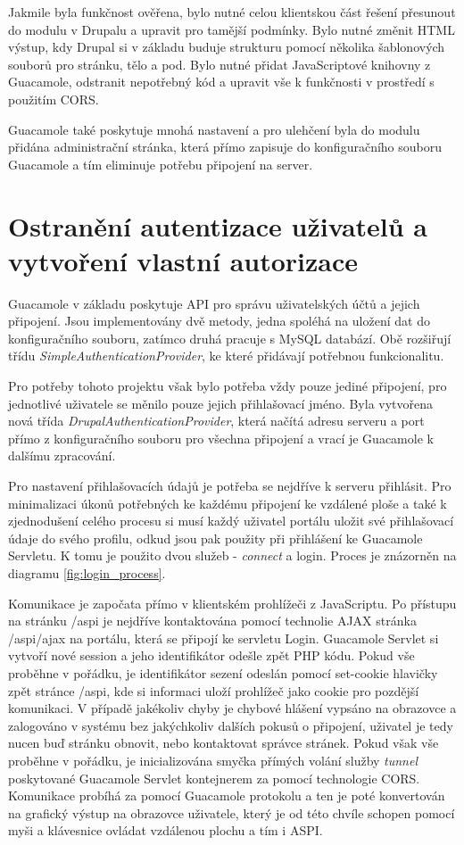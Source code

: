 Jakmile byla funkčnost ověřena, bylo nutné celou klientskou část řešení přesunout do modulu v Drupalu a upravit pro tamější podmínky. Bylo nutné změnit HTML výstup, kdy Drupal si v základu buduje strukturu pomocí několika šablonových souborů pro stránku, tělo a pod. Bylo nutné přidat JavaScriptové knihovny z Guacamole, odstranit nepotřebný kód a upravit vše k funkčnosti v prostředí s použitím CORS. 

Guacamole také poskytuje mnohá nastavení a pro ulehčení byla do modulu přidána administrační stránka, která přímo zapisuje do konfiguračního souboru Guacamole a tím eliminuje potřebu připojení na server. 

\section{Ostranění autentizace uživatelů a vytvoření vlastní autorizace}
Guacamole v základu poskytuje API pro správu uživatelských účtů a jejich připojení. Jsou implementovány dvě metody, jedna spoléhá na uložení dat do konfiguračního souboru, zatímco druhá pracuje s MySQL databází. Obě rozšiřují třídu \emph{SimpleAuthenticationProvider}, ke které přidávají potřebnou funkcionalitu. 

Pro potřeby tohoto projektu však bylo potřeba vždy pouze jediné připojení, pro jednotlivé uživatele se měnilo pouze jejich přihlašovací jméno. Byla vytvořena nová třída \emph{DrupalAuthenticationProvider}, která načítá adresu serveru a port přímo z konfiguračního souboru pro všechna připojení a vrací je Guacamole k dalšímu zpracování. 

Pro nastavení přihlašovacích údajů je potřeba se nejdříve k serveru přihlásit. Pro minimalizaci úkonů potřebných ke každému připojení ke vzdálené ploše a také k zjednodušení celého procesu si musí každý uživatel portálu uložit své přihlašovací údaje do svého profilu, odkud jsou pak použity při přihlášení ke Guacamole Servletu. K tomu je použito dvou služeb - \emph{connect} a {login}. Proces je znázorněn na diagramu \ref{fig:login_process}. 

Komunikace je započata přímo v klientském prohlížeči z JavaScriptu. Po přístupu na stránku /aspi je nejdříve kontaktována pomocí technolie AJAX stránka /aspi/ajax na portálu, která se připojí ke servletu Login. Guacamole Servlet si vytvoří nové \gls{session} a jeho identifikátor odešle zpět PHP kódu. Pokud vše proběhne v pořádku, je identifikátor sezení odeslán pomocí set-cookie hlavičky zpět stránce /aspi, kde si informaci uloží prohlížeč jako cookie pro pozdější komunikaci. V případě jakékoliv chyby je chybové hlášení vypsáno na obrazovce a zalogováno v systému bez jakýchkoliv dalších pokusů o připojení, uživatel je tedy nucen buď stránku obnovit, nebo kontaktovat správce stránek. Pokud však vše proběhne v pořádku, je inicializována smyčka přímých volání služby \emph{tunnel} poskytované Guacamole Servlet kontejnerem za pomocí technologie CORS. Komunikace probíhá za pomocí Guacamole protokolu a ten je poté konvertován na grafický výstup na obrazovce uživatele, který je od této chvíle schopen pomocí myši a klávesnice ovládat vzdálenou plochu a tím i ASPI.

